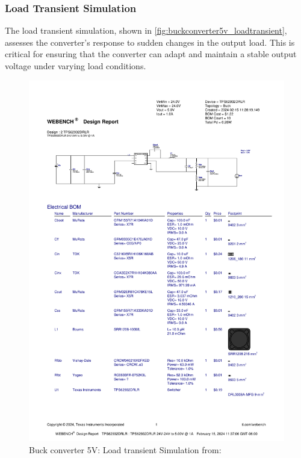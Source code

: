 \subsubsection{Load Transient Simulation}
The load transient simulation, shown in \autoref{fig:buckconverter5v_loadtransient}, assesses the converter's response to sudden changes in the output load. This is critical for ensuring that the converter can adapt and maintain a stable output voltage under varying load conditions.
\begin{figure}[H]
    \centering
    \includegraphics[trim=0 235 0 70,clip,width=0.8\linewidth,page=8]{img//buckconverters//5v/WBDesign2_Load Transient.pdf}
    \caption{Buck converter 5V: Load transient Simulation from: %
    }
    \label{fig:buckconverter5v_loadtransient}
\end{figure}

